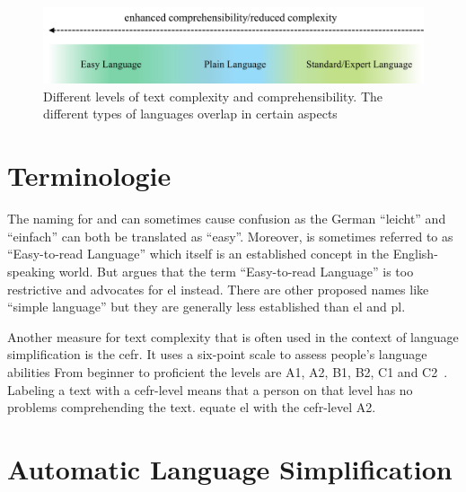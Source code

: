 \begin{figure}
    \centering
    \includegraphics[width=\linewidth]{images/easy_languages}
    \caption[Different levels of text complexity and comprehensibility.]{Different levels of text complexity and comprehensibility. The different types of languages overlap in certain aspects~\autocite{easyLanguageBook}}
    \label{fig:languages}
\end{figure}

\section{Terminologie}\label{sec:term}
The naming for  and  can sometimes cause confusion as the German \enquote{leicht} and \enquote{einfach} can both be translated as \enquote{easy}.
Moreover,  is sometimes referred to as \enquote{Easy-to-read Language} which itself is an established concept in the English-speaking world.
But \textcite{easyLanguageBook} argues that the term \enquote{Easy-to-read Language} is too restrictive and advocates for \gls{el} instead.
There are other proposed names like \enquote{simple language} but they are generally less established than \gls{el} and \gls{pl}.

Another measure for text complexity that is often used in the context of language simplification is the \gls{cefr}.
It uses a six-point scale to assess people's language abilities
From beginner to proficient the levels are A1, A2, B1, B2, C1 and C2~\autocite{cefr_camb}.
Labeling a text with a \gls{cefr}-level means that a person on that level has no problems comprehending the text.
\textcite{schomacker2023data} equate \gls{el} with the \gls{cefr}-level A2.




\section{Automatic Language Simplification}\label{sec:langSimp}


